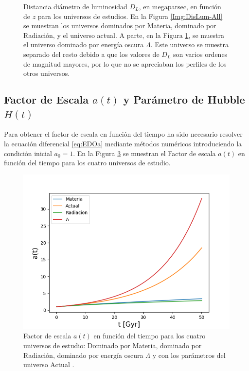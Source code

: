 \documentclass[twoside]{article}
\begin{document}
\begin{figure}[H]
\begin{subfigure}{.5\textwidth}
							\label{Img:DisLum-EngOsc}
						\end{subfigure}
						\caption{Distancia diámetro de luminosidad $D_L$, en megaparsec, en función de $z$ para los universos de estudios. En la Figura \ref{Img:DisLum-All} se muestran los universos dominados por Materia, dominado por Radiación, y el universo actual. A parte, en la Figura \ref{Img:DisLum-EngOsc}, se muestra el universo dominado por energía oscura $\Lambda$. Este universo se muestra separado del resto debido a que los valores de $D_L$ son varios ordenes de magnitud mayores, por lo que no se apreciaban los perfiles de los otros universos.}
						\label{Img:DisLum}
					\end{figure}

			\subsection{Factor de Escala \texorpdfstring{$a(t)$}{TEXT} y Parámetro de Hubble \texorpdfstring{$H(t)$}{TEXT}}
				\label{sec:a-H}

				Para obtener el factor de escala en función del tiempo ha sido necesario resolver la ecuación diferencial \ref{eq:EDOa} mediante métodos numéricos introduciendo la condición inicial $a_0 = 1$. En la Figura \ref{Img:FactorEscala} se muestran el Factor de escala $a(t)$ en función del tiempo para los cuatro universos de estudio.

					\begin{figure}[H]
						\centering
						\includegraphics[scale=0.6]{factorEscala.png}
						\caption{\label{Img:FactorEscala}Factor de escala $a(t)$ en función del tiempo para los cuatro universos de estudio: Dominado por \textnormal{Materia}, dominado por \textnormal{Radiación}, dominado por energía oscura $\Lambda$ y con los parámetros del universo \textnormal{Actual} \cite{Plank}.}
					\end{figure}
\end{document}
